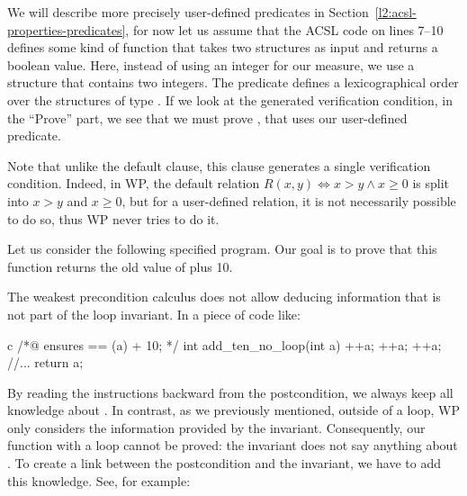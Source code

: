 

We will describe more precisely user-defined predicates in
Section~\ref{l2:acsl-properties-predicates}, for now let us assume that
the ACSL code on lines 7--10 defines some kind of function that takes two
structures as input and returns a boolean value. Here, instead of using an
integer for our measure, we use a structure that contains two integers. The
 predicate defines a lexicographical order over the
structures of type . If we look at the generated verification
condition, in the ``Prove'' part, we see that we must prove
, that uses our user-defined predicate.


Note that unlike the default  clause, this clause
generates a single verification condition. Indeed, in WP, the default relation
$R(x,y) \Leftrightarrow x > y \wedge x \geq 0$ is split into $x > y$ and
$x \geq 0$, but for a user-defined relation, it is not necessarily possible to
do so, thus WP never tries to do it.




Let us consider the following specified program. Our goal is to prove
that this function returns the old value of  plus 10.






The weakest precondition calculus does not allow deducing information
that is not part of the loop invariant. In a piece of code like:



\begin{CodeBlock}{c}
/*@
    ensures \result == \old(a) + 10;
*/
int add_ten_no_loop(int a){
    ++a;
    ++a;
    ++a;
    //...
    return a;
}
\end{CodeBlock}


By reading the instructions backward
from the postcondition, we always keep all knowledge about . In
contrast, as we previously mentioned, outside of a loop, WP only
considers the information provided by the invariant. Consequently, our
 function with a loop cannot be proved: the invariant does not say anything
about . To create a link between the postcondition and the
invariant, we have to add this knowledge. See, for example:



